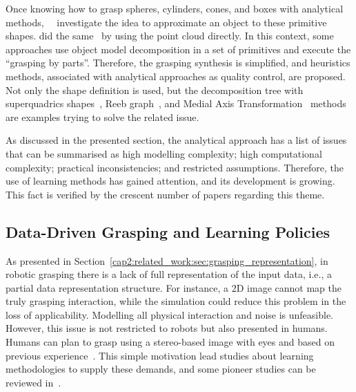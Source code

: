
Once knowing how to grasp spheres, cylinders, cones, and boxes with analytical methods,~\citeauthor{Miller2003}~\cite{Miller2003} investigate the idea to approximate an object to these primitive shapes. \citeauthor{Jain2016} did the same~\cite{Jain2016} by using the point cloud directly. In this context, some approaches use object model decomposition in a set of primitives and execute the ``grasping by parts''. Therefore, the grasping synthesis is simplified, and heuristics methods, associated with analytical approaches as quality control, are proposed. Not only the shape definition is used, but the decomposition tree with superquadrics shapes~\cite{Goldfeder2007}, Reeb graph~\cite{Aleotti2012}, and Medial Axis Transformation~\cite{Przybylski2011} methods are examples trying to solve the related issue. 



As discussed in the presented section, the analytical approach has a list of issues that can be summarised as high modelling complexity; high computational complexity; practical inconsistencies; and restricted assumptions. Therefore, the use of learning methods has gained attention, and its development is growing. This fact is verified by the crescent number of papers regarding this theme.

\subsection{Data-Driven Grasping and Learning Policies} 
\label{cap2:related_work:sec:grasping_approaches:subsec:learning_review}

As presented in Section~\ref{cap2:related_work:sec:grasping_representation}, in robotic grasping there is a lack of full representation of the input data, i.e., a partial data representation structure. For instance, a 2D image cannot map the truly grasping interaction, while the simulation could reduce this problem in the loss of applicability. Modelling all physical interaction and noise is unfeasible. However, this issue is not restricted to robots but also presented in humans. Humans can plan to grasp using a stereo-based image with eyes and based on previous experience~\cite{castiello2005neuroscience}. This simple motivation lead studies about learning methodologies to supply these demands, and some pioneer studies can be reviewed in~\cite{Oztop2001, Wheeler2002, Rezzoug2002}.

